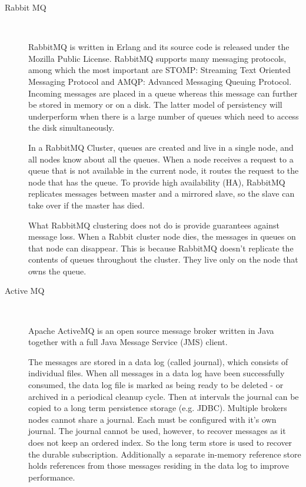 \begin{description}
    \item [Rabbit MQ] \hfill \\
    {
    RabbitMQ is written in Erlang and its source code is released under the
    Mozilla Public License. RabbitMQ supports many messaging protocols, among
    which the most important are STOMP: Streaming Text Oriented Messaging
    Protocol and AMQP: Advanced Messaging Queuing Protocol. Incoming messages
    are placed in a queue whereas this message can further be stored in memory
    or on a disk. The latter model of persistency will underperform when there is 
    a large number of queues which need to access the disk simultaneously.
    \cite{rabbitmq}

    In a RabbitMQ Cluster, queues are created and live in a single node, and all
    nodes know about all the queues. When a node receives a request to a queue
    that is not available in the current node, it routes the request to the node
    that has the queue. To provide high availability (HA), RabbitMQ replicates
    messages between master and a mirrored slave, so the slave can take over if the
    master has died. \cite{wickramarachchi2012andes}

    What RabbitMQ clustering does not do is provide guarantees against message loss.
    When a Rabbit cluster node dies, the messages in queues on that
    node can disappear. This is because RabbitMQ doesn't replicate the contents
    of queues throughout the cluster. They live only on the node that owns the
    queue. \cite{videla2012rabbitmq}
    }
    \item [Active MQ] \hfill \\
    {
    Apache ActiveMQ is an open source message broker written in Java
    together with a full Java Message Service (JMS) client. 

    The messages are stored in a data log (called journal), which consists of
    individual files. When all messages in a data log have been successfully
    consumed, the data log file is marked as being ready to be deleted - or
    archived in a periodical cleanup cycle. Then at intervals the journal can be
    copied to a long term persistence storage (e.g. JDBC). Multiple
    brokers nodes cannot share a journal. Each must be configured with it's own
    journal. The journal cannot be used, however, to recover messages as it does
    not keep an ordered index. So the long term store is used to recover the
    durable subscription. Additionally a separate in-memory reference store
    holds references from those messages residing in the data log to improve
    performance.

}
\end{description}
